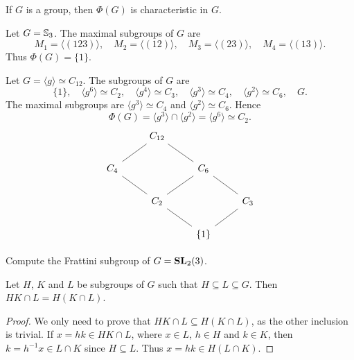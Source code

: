 \begin{exercise}
\label{xca:Phi(G)char}
	If $G$ is a group, then $\Phi(G)$ is characteristic in $G$.
\end{exercise}

\begin{example}
	Let $G=\mathbb{S}_3$. The maximal subgroups of $G$ are 
	\[
	M_1=\langle (123)\rangle,
	\quad
	M_2=\langle (12)\rangle,
	\quad
	M_3=\langle (23)\rangle,
	\quad
	M_4=\langle (13)\rangle.
	\]
	Thus 
	$\Phi(G)=\{1\}$. 
\end{example}

\begin{example}
	Let $G=\langle g\rangle\simeq C_{12}$. The subgroups of $G$ are  
	\[
	\{1\},\quad
	\langle g^6\rangle\simeq C_2,\quad
	\langle g^4\rangle\simeq C_3,\quad
	\langle g^3\rangle\simeq C_4,\quad
	\langle g^2\rangle\simeq C_6,\quad
	G.
	\]
	The maximal subgroups are $\langle g^3\rangle\simeq C_4$ and $\langle
	g^2\rangle\simeq C_6$. Hence \[
	\Phi(G)=\langle g^3\rangle\cap \langle
	g^2\rangle=\langle g^6\rangle\simeq C_2.
	\] 
\[\begin{tikzcd}
	& {C_{12}} \\
	{C_4} && {C_6} \\
	& {C_2} && {C_3} \\
	&& {\{1\}}
	\arrow[no head, from=4-3, to=3-2]
	\arrow[no head, from=4-3, to=3-4]
	\arrow[no head, from=3-4, to=2-3]
	\arrow[no head, from=2-3, to=1-2]
	\arrow[no head, from=3-2, to=2-1]
	\arrow[no head, from=2-1, to=1-2]
	\arrow[no head, from=3-2, to=2-3]
\end{tikzcd}\]
\end{example}

\begin{exercise}
	Compute the Frattini subgroup of $G=\mathbf{SL}_2(3)$.  
\end{exercise}

\begin{lemma}[Dedekind]
	\label{lem:Dedekind}
	Let $H$, $K$ and $L$ be subgroups of $G$ such that $H\subseteq L\subseteq G$. Then
	$HK\cap L=H(K\cap L)$.
\end{lemma}

\begin{proof}
	We only need to prove that $HK\cap L\subseteq H(K\cap L)$, 
	as the other inclusion is trivial. If 
	$x=hk\in HK\cap L$, where $x\in L$, $h\in H$ and $k\in K$,
	then $k=h^{-1}x\in L\cap K$ since $H\subseteq L$. Thus $x=hk\in H(L\cap
	K)$.
\end{proof}

